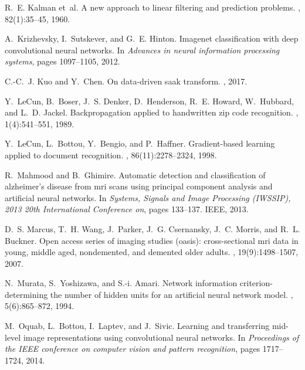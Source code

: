 \documentclass[10pt,onecolumn]{article}
\begin{document}
\begin{thebibliography}{10}
R.~E. Kalman et~al.
\newblock A new approach to linear filtering and prediction problems.
, 82(1):35--45, 1960.

A.~Krizhevsky, I.~Sutskever, and G.~E. Hinton.
\newblock Imagenet classification with deep convolutional neural networks.
\newblock In {\em Advances in neural information processing systems}, pages
  1097--1105, 2012.

C.-C.~J. Kuo and Y.~Chen.
\newblock On data-driven saak transform.
, 2017.

Y.~LeCun, B.~Boser, J.~S. Denker, D.~Henderson, R.~E. Howard, W.~Hubbard, and
  L.~D. Jackel.
\newblock Backpropagation applied to handwritten zip code recognition.
, 1(4):541--551, 1989.

Y.~LeCun, L.~Bottou, Y.~Bengio, and P.~Haffner.
\newblock Gradient-based learning applied to document recognition.
, 86(11):2278--2324, 1998.

R.~Mahmood and B.~Ghimire.
\newblock Automatic detection and classification of alzheimer's disease from
  mri scans using principal component analysis and artificial neural networks.
\newblock In {\em Systems, Signals and Image Processing (IWSSIP), 2013 20th
  International Conference on}, pages 133--137. IEEE, 2013.

D.~S. Marcus, T.~H. Wang, J.~Parker, J.~G. Csernansky, J.~C. Morris, and R.~L.
  Buckner.
\newblock Open access series of imaging studies (oasis): cross-sectional mri
  data in young, middle aged, nondemented, and demented older adults.
, 19(9):1498--1507, 2007.

N.~Murata, S.~Yoshizawa, and S.-i. Amari.
\newblock Network information criterion-determining the number of hidden units
  for an artificial neural network model.
, 5(6):865--872, 1994.

M.~Oquab, L.~Bottou, I.~Laptev, and J.~Sivic.
\newblock Learning and transferring mid-level image representations using
  convolutional neural networks.
\newblock In {\em Proceedings of the IEEE conference on computer vision and
  pattern recognition}, pages 1717--1724, 2014.


\end{thebibliography}
\end{document}
